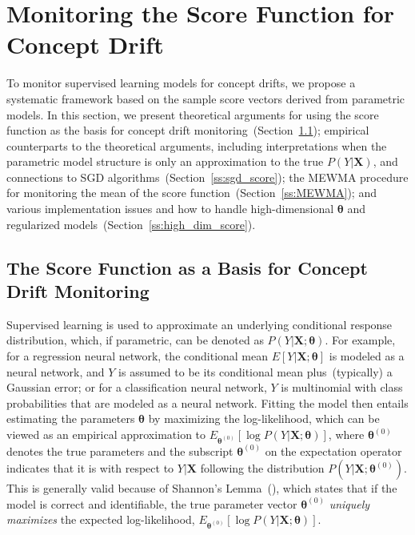 \documentclass[twoside,11pt]{article}
\begin{document}
\section{Monitoring the Score Function for Concept Drift}
\label{s:theory_analysis_score}
To monitor supervised learning models for concept drifts, we propose a systematic framework based on the sample score vectors derived from parametric models. In this section, we present theoretical arguments for using the score function as the basis for concept drift monitoring~(Section~\ref{ss:score_func}); empirical counterparts to the theoretical arguments, including interpretations when the parametric model structure is only an approximation to the true $P(Y|\bm{X})$, and connections to SGD algorithms~(Section~\ref{ss:sgd_score}); the MEWMA procedure for monitoring the mean of the score function~(Section~\ref{ss:MEWMA}); and various implementation issues and how to handle high-dimensional $\bm{\theta}$ and regularized models~(Section~\ref{ss:high_dim_score}).

\subsection{The Score Function as a Basis for Concept Drift Monitoring}
\label{ss:score_func}
Supervised learning is used to approximate an underlying conditional response distribution, which, if parametric, can be denoted as $P(Y|\bm{X};\bm{\theta})$. For example, for a regression neural network, the conditional mean $E[Y|\bm{X};\bm{\theta}]$ is modeled as a neural network, and $Y$ is assumed to be its conditional mean plus~(typically) a Gaussian error; or for a classification neural network, $Y$ is multinomial with class probabilities that are modeled as a neural network. Fitting the model then entails estimating the parameters $\bm{\theta}$ by maximizing the log-likelihood, which can be viewed as an empirical approximation to $E_{\bm{\theta}^{(0)}}[\log{P(Y|\bm{X};\bm{\theta})}]$, where $\bm{\theta}^{(0)}$ denotes the true parameters and the subscript $\bm { \theta} ^{ (0)}$ on the expectation operator indicates that it is with respect to $Y|\bm{X}$ following the distribution $P(Y|\bm{X};\bm{\theta}^{(0)})$. This is generally valid because of Shannon's Lemma~(\cite{shannon1948mathematical}), which states that if the model is correct and identifiable, the true parameter vector $\bm{\theta}^{(0)}$ \textit{uniquely maximizes} the expected log-likelihood, $E_{\bm{\theta}^{(0)}}[\log{P(Y|\bm{X};\bm{\theta})}]$. 
\end{document}
